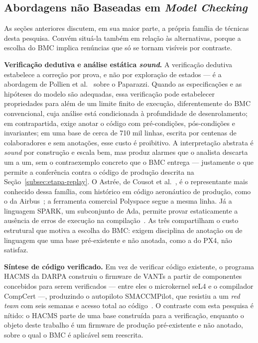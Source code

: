 \subsection{Abordagens não Baseadas em \textit{Model Checking}}
\label{subsec:rel-nao-bmc}

As seções anteriores discutem, em sua maior parte, a própria família de técnicas
desta pesquisa. Convém situá-la também em relação às alternativas, porque a
escolha do BMC implica renúncias que só se tornam visíveis por contraste.

\textbf{Verificação dedutiva e análise estática \textit{sound}.} A verificação
dedutiva estabelece a correção por prova, e não por exploração de estados --- é a
abordagem de Pollien et al.~\cite{Pollien2021} sobre o Paparazzi. Quando as
especificações e as hipóteses do modelo são adequadas, essa verificação pode
estabelecer propriedades para além de um limite finito de execução, diferentemente
do BMC convencional, cuja análise está condicionada à profundidade de
desenrolamento; em contrapartida, exige anotar o código com pré-condições,
pós-condições e invariantes; em uma
base de cerca de 710 mil linhas, escrita por centenas de colaboradores e sem
anotações, esse custo é proibitivo. A interpretação abstrata é \textit{sound} por
construção e escala bem, mas produz alarmes que o analista descarta um a um, sem
o contraexemplo concreto que o BMC entrega --- justamente o que permite a
conferência contra o código de produção descrita na
Seção~\ref{subsec:etapa-replay}. O Astrée, de Cousot et
al.~\cite{Cousot2005Astree}, é o representante mais conhecido dessa família, com
histórico em código aeronáutico de produção, como o da Airbus~\cite{Bertrane2010};
a ferramenta comercial Polyspace segue a mesma linha. Já a linguagem SPARK, um
subconjunto de Ada, permite provar estaticamente a ausência de erros de execução
na compilação~\cite{McCormick2015}. As três compartilham o custo estrutural que
motiva a escolha do BMC: exigem disciplina de anotação ou de linguagem que uma
base pré-existente e não anotada, como a do PX4, não satisfaz.

\textbf{Síntese de código verificado.} Em vez de verificar código existente, o
programa HACMS da DARPA construiu o firmware de VANTs a partir de componentes
concebidos para serem verificados --- entre eles o microkernel seL4 e o
compilador CompCert ---, produzindo o autopiloto SMACCMPilot, que resistiu a um
\textit{red team} com seis semanas e acesso total ao código~\cite{Fisher2017}. O
contraste com esta pesquisa é nítido: o HACMS parte de uma base construída para a
verificação, enquanto o objeto deste trabalho é um firmware de produção
pré-existente e não anotado, sobre o qual o BMC é aplicável sem reescrita.

